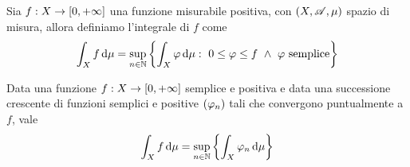 \begin{definition}\label{def:IntegralePositive}
	Sia $f:X\to[0,+\infty]$ una funzione misurabile positiva, con $(X,\mathscr A,\mu)$ spazio di misura, allora definiamo l'integrale di $f$ come
	\begin{equation*}
		\int_Xf\,\mathrm d\mu=\sup_{n\in\mathbb N}\left\{\int_X\varphi\,\mathrm d \mu:\ 0\le \varphi\le f\ \wedge\ \varphi \text{ semplice}\right\}
	\end{equation*}
\end{definition}

\begin{proposition} \label{DefinizioneEquivalenteIntegralePositive}
	Data una funzione $f:X\to[0,+\infty]$ semplice e positiva e data una successione crescente di funzioni semplici e positive $(\varphi_n)$ tali che convergono puntualmente a $f$, vale 
	\begin{equation*}
		\int_X f\,\mathrm d\mu=\sup_{n\in\mathbb N}\left\{\int_X\varphi_n\,\mathrm d\mu\right\}
	\end{equation*}
\end{proposition}
